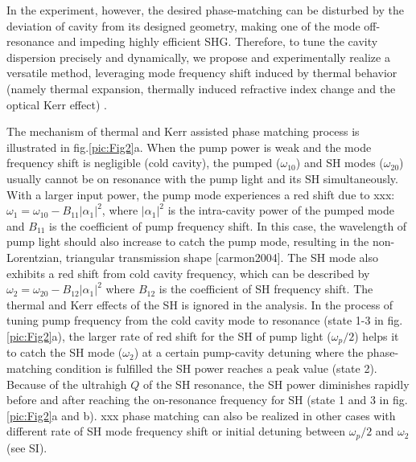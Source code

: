 \documentclass[a4paper,8pt,hyperref, twocolumn]{article}
\begin{document}
In the experiment, however, the desired phase-matching can be disturbed by the deviation of cavity from its designed geometry, making one of the mode off-resonance and impeding highly efficient SHG. 
Therefore, to tune the cavity dispersion precisely and dynamically, we propose and experimentally realize a versatile method, leveraging mode frequency shift induced by thermal behavior (namely thermal expansion, thermally induced refractive index change and the optical Kerr effect) \cite{del2011octave, herr2014temporal}.

The mechanism of thermal and Kerr assisted phase matching process is illustrated in fig.\ref{pic:Fig2}a. 
When the pump power is weak and the mode frequency shift is negligible (cold cavity), the pumped ($\omega_{10}$) and SH modes ($\omega_{20}$) usually cannot be on resonance with the pump light and its SH simultaneously. 
With a larger input power, the pump mode experiences a red shift due to xxx: $\omega_1 = \omega_{10}-B_{11}|\alpha_1|^2$, where $|\alpha_1|^2$ is the intra-cavity power of the pumped mode and $B_{11}$ is the coefficient of pump frequency shift. In this case, the wavelength of pump light should also increase to catch the pump mode, resulting in the non-Lorentzian, triangular transmission shape [carmon2004].
The SH mode also exhibits a red shift from cold cavity frequency, which can be described by $\omega_2 = \omega_{20}-B_{12}|\alpha_1|^2$ where $B_{12}$ is the coefficient of SH frequency shift. The thermal and Kerr effects of the SH is ignored in the analysis.
In the process of tuning pump frequency from the cold cavity mode to resonance (state 1-3 in fig.\ref{pic:Fig2}a), the larger rate of red shift for the SH of pump light ($\omega_p/2$) helps it to catch the SH mode ($\omega_2$) at a certain pump-cavity detuning  where the phase-matching condition is fulfilled the SH power reaches a peak value (state 2).
Because of the ultrahigh $Q$ of the SH resonance, the SH power diminishes rapidly before and after reaching the on-resonance frequency for SH (state 1 and 3 in fig.\ref{pic:Fig2}a and b). 
xxx phase matching can also be realized in other cases with different rate of SH mode frequency shift or initial detuning between $\omega_p/2$ and $\omega_2$ (see SI).
\end{document}
